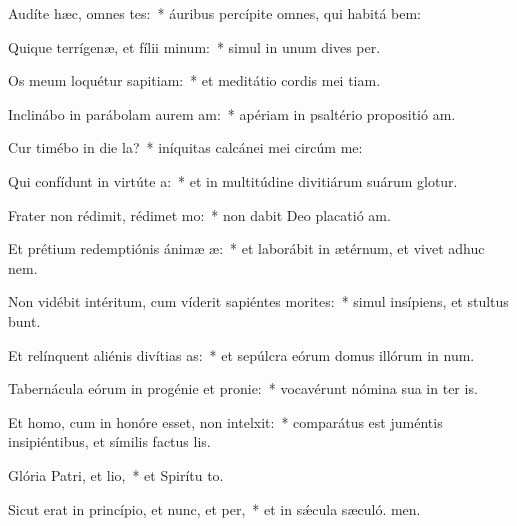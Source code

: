 \item Audíte hæc, omnes tes:~* áuribus percípite omnes, qui habitá bem:
\item Quique terrígenæ, et fílii minum:~* simul in unum dives  per.
\item Os meum loquétur sapitiam:~* et meditátio cordis mei tiam.
\item Inclinábo in parábolam aurem am:~* apériam in psaltério propositió am.
\item Cur timébo in die la?~* iníquitas calcánei mei circúm me:
\item Qui confídunt in virtúte a:~* et in multitúdine divitiárum suárum glotur.
\item Frater non rédimit, rédimet mo:~* non dabit Deo placatió am.
\item Et prétium redemptiónis ánimæ æ:~* et laborábit in ætérnum, et vivet adhuc  nem.
\item Non vidébit intéritum, cum víderit sapiéntes morites:~* simul insípiens, et stultus bunt.
\item Et relínquent aliénis divítias as:~* et sepúlcra eórum domus illórum in num.
\item Tabernácula eórum in progénie et pronie:~* vocavérunt nómina sua in ter is.
\item Et homo, cum in honóre esset, non intelxit:~* comparátus est juméntis insipiéntibus, et símilis factus  lis.
\item Glória Patri, et lio,~* et Spirítu to.
\item Sicut erat in princípio, et nunc, et per,~* et in sǽcula sæculó. men.
